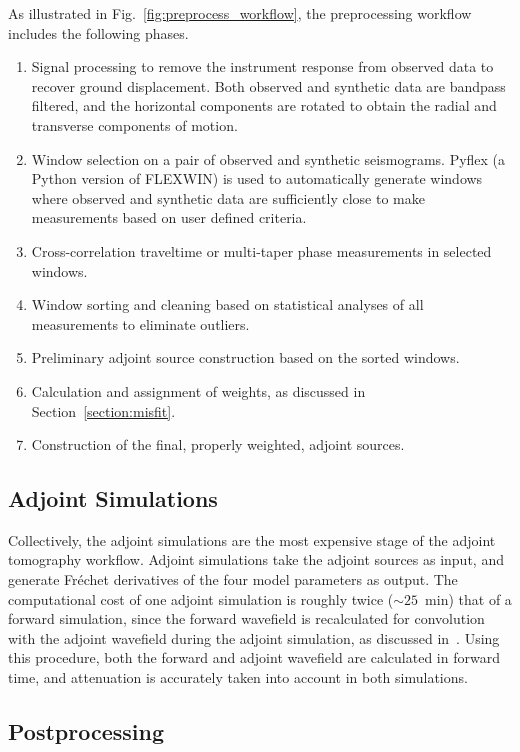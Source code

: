 \documentclass[extra,mreferee]{gji}
\begin{document}
As illustrated in Fig.~\ref{fig:preprocess_workflow}, the preprocessing workflow includes the following phases.
\begin{enumerate}
  \item Signal processing to remove the instrument response from observed data
    to recover ground displacement. Both observed and synthetic data are bandpass
    filtered, and the horizontal components are rotated to obtain the radial and transverse components of motion.
  \item Window selection on a pair of
    observed and synthetic seismograms. Pyflex (a Python version
    of FLEXWIN) is
    used to automatically generate windows where observed and
    synthetic data are sufficiently close to make measurements based on user defined
    criteria.
  \item Cross-correlation traveltime or multi-taper phase measurements in selected windows.
  \item Window sorting and cleaning based on statistical analyses of all measurements to eliminate outliers.
  \item Preliminary adjoint source construction based on the sorted windows.
  \item Calculation and assignment of weights, as discussed in Section~\ref{section:misfit}.
  \item Construction of the final, properly weighted, adjoint sources.
\end{enumerate}

\subsection{Adjoint Simulations}

Collectively,
the adjoint simulations are the most expensive stage of the adjoint tomography workflow. 
Adjoint simulations take the adjoint sources as input, and generate Fr\'echet
derivatives of the four model parameters as output.
The computational cost of one adjoint simulation is roughly twice ($\sim25$~min) that of a forward simulation,
since the forward wavefield is recalculated for convolution with the adjoint wavefield during the adjoint simulation,
as discussed in~\cite{KoXiBoPeSaLiTr16}.
Using this procedure,
both the forward and adjoint wavefield are calculated in forward time,
and attenuation is accurately taken into account in both simulations.

\subsection{Postprocessing}
\end{document}
